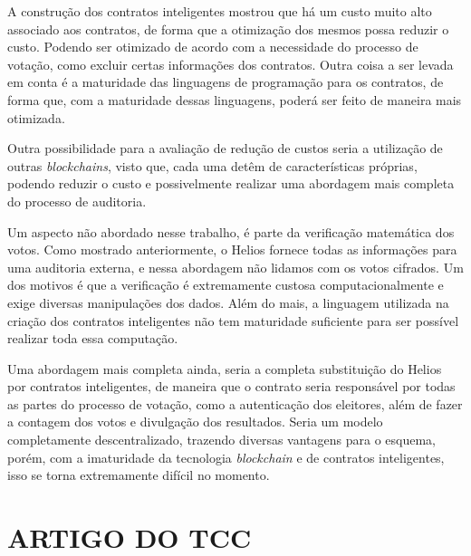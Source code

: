 \documentclass{ufsctex/ufsctex}
\begin{document}
A construção dos contratos inteligentes mostrou que há um custo muito alto
associado aos contratos, de forma que a otimização dos mesmos possa reduzir o
custo. Podendo ser otimizado de acordo com a necessidade do processo de
votação, como excluir certas informações dos contratos. Outra coisa a ser
levada em conta é a maturidade das linguagens de programação para os contratos,
de forma que, com a maturidade dessas linguagens, poderá ser feito de maneira
mais otimizada.

Outra possibilidade para a avaliação de redução de custos seria a utilização de
outras \textit{blockchains}, visto que, cada uma detêm de características
próprias, podendo reduzir o custo e possivelmente realizar uma abordagem mais
completa do processo de auditoria.

Um aspecto não abordado nesse trabalho, é parte da verificação matemática dos
votos. Como mostrado anteriormente, o Helios fornece todas as informações para
uma auditoria externa, e nessa abordagem não lidamos com os votos cifrados.  Um
dos motivos é que a verificação é extremamente custosa computacionalmente e
exige diversas manipulações dos dados. Além do mais, a linguagem utilizada na
criação dos contratos inteligentes não tem maturidade suficiente para ser
possível realizar toda essa computação.

Uma abordagem mais completa ainda, seria a completa substituição do Helios por
contratos inteligentes, de maneira que o contrato seria responsável por todas
as partes do processo de votação, como a autenticação dos eleitores, além de
fazer a contagem dos votos e divulgação dos resultados. Seria um modelo
completamente descentralizado, trazendo diversas vantagens para o esquema,
porém, com a imaturidade da tecnologia \textit{blockchain} e de contratos
inteligentes, isso se torna extremamente difícil no momento.




\apendice{}

\chapter{ARTIGO DO TCC}
\end{document}
